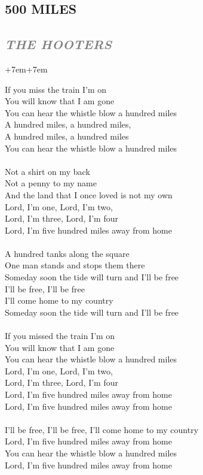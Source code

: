 \documentclass[100pt,a4paper]{report}
\newenvironment{song1}[3]
	{
			\begin{spacing}{0.6}
				\section*{\LARGE\centering \MakeUppercase{\textbf{{#1}}}}
				\subsection*{\Large\centering \textit{\textcolor{gray}{\MakeUppercase{{#2}}}}}
			\end{spacing}
			\vspace{0.8cm}
			\begin{adjustwidth}{+7em}{+7em}
			\Large
			
	}
	{
		\end{adjustwidth}
		\newpage
    }
\begin{document}
\begin{song1}{500 Miles}{The Hooters}
\noindent
If you miss the train I'm on\\
You will know that I am gone\\
You can hear the whistle blow a hundred miles\\
A hundred miles, a hundred miles,\\
A hundred miles, a hundred miles\\
You can hear the whistle blow a hundred miles\\
\\
Not a shirt on my back\\
Not a penny to my name\\
And the land that I once loved is not my own\\
Lord, I'm one, Lord, I'm two,\\
Lord, I'm three, Lord, I'm four\\
Lord, I'm five hundred miles away from home\\
\\
A hundred tanks along the square\\
One man stands and stops them there\\
Someday soon the tide will turn and I'll be free\\
I'll be free, I'll be free\\
I'll come home to my country\\
Someday soon the tide will turn and I'll be free\\
\\
If you missed the train I'm on\\
You will know that I am gone\\
You can hear the whistle blow a hundred miles\\
Lord, I'm one, Lord, I'm two,\\
Lord, I'm three, Lord, I'm four\\
Lord, I'm five hundred miles away from home\\
Lord, I'm five hundred miles away from home\\
\\
I'll be free, I'll be free, I'll come home to my country\\
Lord, I'm five hundred miles away from home\\
You can hear the whistle blow a hundred miles\\
Lord, I'm five hundred miles away from home
\end{song1}
\end{document}
